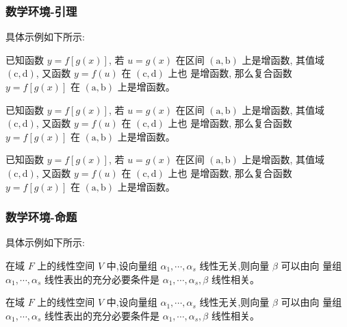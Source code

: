 \subsubsection{数学环境-引理}
具体示例如下所示:
    \begin{lemma}[某某引理]
    已知函数 $y=f[g(x)]$, 若 $u=g(x)$ 在区间 $(\mathrm{a}, \mathrm{b})$ 上是增函数, 其值域 $(\mathrm{c}, \mathrm{d})$, 又函数 $y=f(u)$ 在 $(\mathrm{c}, \mathrm{d})$ 上也 是增函数, 那么复合函数 $y=f[g(x)]$ 在 $(\mathrm{a}, \mathrm{b})$ 上是增函数。
\end{lemma}
\begin{tcblisting}{}
    \begin{lemma}[某某引理]
已知函数 $y=f[g(x)]$, 若 $u=g(x)$ 在区间 $(\mathrm{a}, \mathrm{b})$ 上是增函数, 其值域 $(\mathrm{c}, \mathrm{d})$, 又函数 $y=f(u)$ 在 $(\mathrm{c}, \mathrm{d})$ 上也 是增函数, 那么复合函数 $y=f[g(x)]$ 在 $(\mathrm{a}, \mathrm{b})$ 上是增函数。
    \end{lemma}
\end{tcblisting}

\begin{lemma*}[某某引理]
已知函数 $y=f[g(x)]$, 若 $u=g(x)$ 在区间 $(\mathrm{a}, \mathrm{b})$ 上是增函数, 其值域 $(\mathrm{c}, \mathrm{d})$, 又函数 $y=f(u)$ 在 $(\mathrm{c}, \mathrm{d})$ 上也 是增函数, 那么复合函数 $y=f[g(x)]$ 在 $(\mathrm{a}, \mathrm{b})$ 上是增函数。
\end{lemma*}



\subsubsection{数学环境-命题}
具体示例如下所示:
\begin{proposition}
    在域 $F$ 上的线性空间 $V$ 中,设向量组 $\alpha_{1}, \cdots, \alpha_{s}$ 线性无关,则向量 $\beta$ 可以由向 量组 $\alpha_{1}, \cdots, \alpha_{s}$ 线性表出的充分必要条件是 $\alpha_{1}, \cdots, \alpha_{s}, \beta$ 线性相关。
\end{proposition}

\begin{tcblisting}{}
\begin{proposition}
    在域 $F$ 上的线性空间 $V$ 中,设向量组 $\alpha_{1}, \cdots, \alpha_{s}$ 线性无关,则向量 $\beta$ 可以由向 量组 $\alpha_{1}, \cdots, \alpha_{s}$ 线性表出的充分必要条件是 $\alpha_{1}, \cdots, \alpha_{s}, \beta$ 线性相关。
\end{proposition}
\end{tcblisting}


